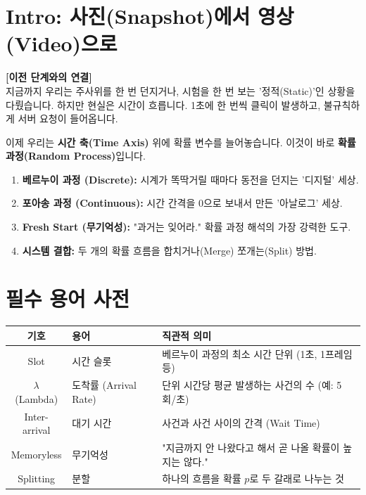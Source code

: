 \documentclass[11pt,a4paper]{book}
\theoremstyle{definition}
\begin{document}
\section*{Intro: 사진(Snapshot)에서 영상(Video)으로}

\textbf{[이전 단계와의 연결]} \\
지금까지 우리는 주사위를 한 번 던지거나, 시험을 한 번 보는 '정적(Static)'인 상황을 다뤘습니다. 하지만 현실은 시간이 흐릅니다. 1초에 한 번씩 클릭이 발생하고, 불규칙하게 서버 요청이 들어옵니다.

이제 우리는 \textbf{시간 축(Time Axis)} 위에 확률 변수를 늘어놓습니다. 이것이 바로 \textbf{확률 과정(Random Process)}입니다.

\begin{tcolorbox}[colback=subgray, title={\textbf{📌 이 단원의 핵심 개요 (Overview)}}]
\begin{enumerate}
    \item \textbf{베르누이 과정 (Discrete):} 시계가 똑딱거릴 때마다 동전을 던지는 '디지털' 세상.
    \item \textbf{포아송 과정 (Continuous):} 시간 간격을 0으로 보내서 만든 '아날로그' 세상.
    \item \textbf{Fresh Start (무기억성):} "과거는 잊어라." 확률 과정 해석의 가장 강력한 도구.
    \item \textbf{시스템 결합:} 두 개의 확률 흐름을 합치거나(Merge) 쪼개는(Split) 방법.
\end{enumerate}
\end{tcolorbox}

\section{필수 용어 사전}

\begin{center}
\begin{tabular}{|c|l|l|}
\hline
\rowcolor{mainblue!20} \textbf{기호} & \textbf{용어} & \textbf{직관적 의미} \\ \hline
Slot & 시간 슬롯 & 베르누이 과정의 최소 시간 단위 (1초, 1프레임 등) \\ \hline
$\lambda$ (Lambda) & 도착률 (Arrival Rate) & 단위 시간당 평균 발생하는 사건의 수 (예: 5회/초) \\ \hline
Inter-arrival & 대기 시간 & 사건과 사건 사이의 간격 (Wait Time) \\ \hline
Memoryless & 무기억성 & "지금까지 안 나왔다고 해서 곧 나올 확률이 높지는 않다." \\ \hline
Splitting & 분할 & 하나의 흐름을 확률 $p$로 두 갈래로 나누는 것 \\ \hline
\end{tabular}
\end{center}
\end{document}
